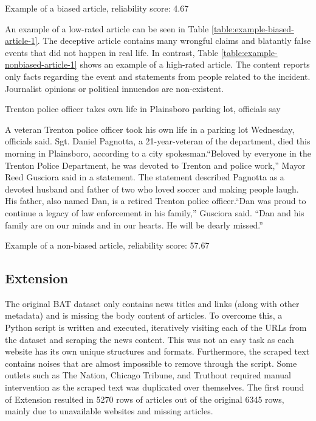 \begin{table}[htbp]
\begin{minipage}{0.9\linewidth}
    \end{minipage}
    \caption{Example of a biased article, reliability score: 4.67}
    \label{table:example-biased-article-1}
\end{table}

An example of a low-rated article can be seen in Table \ref{table:example-biased-article-1}. The deceptive article contains many wrongful claims and blatantly false events that did not happen in real life. In contrast, Table \ref{table:example-nonbiased-article-1} shows an example of a high-rated article. The content reports only facts regarding the event and statements from people related to the incident. Journalist opinions or political innuendos are non-existent.


\begin{table}[htbp]
    \centering
    \begin{minipage}{0.9\linewidth}
        \begin{center}
            \small{Trenton police officer takes own life in Plainsboro parking lot, officials say}
        \end{center}
        \scriptsize{
            A veteran Trenton police officer took his own life in a parking lot Wednesday, officials said. Sgt. Daniel Pagnotta, a 21-year-veteran of the department, died this morning in Plainsboro, according to a city spokesman.“Beloved by everyone in the Trenton Police Department, he was devoted to Trenton and police work,” Mayor Reed Gusciora said in a statement. The statement described Pagnotta as a devoted husband and father of two who loved soccer and making people laugh. His father, also named Dan, is a retired Trenton police officer.“Dan was proud to continue a legacy of law enforcement in his family,” Gusciora said. “Dan and his family are on our minds and in our hearts. He will be dearly missed.”}
    \end{minipage}
    \caption{Example of a non-biased article, reliability score: 57.67}
    \label{table:example-nonbiased-article-1}
\end{table}

\subsection{Extension}

The original BAT dataset only contains news titles and links (along with other metadata) and is missing the body content of articles. To overcome this, a Python script is written and executed, iteratively visiting each of the URLs from the dataset and scraping the news content. This was not an easy task as each website has its own unique structures and formats. Furthermore, the scraped text contains noises that are almost impossible to remove through the script. Some outlets such as The Nation, Chicago Tribune, and Truthout required manual intervention as the scraped text was duplicated over themselves. The first round of Extension resulted in 5270 rows of articles out of the original 6345 rows, mainly due to unavailable websites and missing articles.

